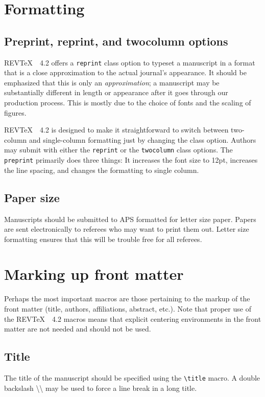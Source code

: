\documentclass[twocolumn,secnumarabic,amssymb, nobibnotes, aps, prd]{revtex4-2}
\newcommand{\revtex}{REV\TeX\ }
\newcommand{\classoption}[1]{\texttt{#1}}
\newcommand{\macro}[1]{\texttt{\textbackslash#1}}
\newcommand{\m}[1]{\macro{#1}}
\begin{document}
\section{Formatting}
\subsection{Preprint, reprint, and twocolumn options}
\revtex~4.2 offers a \classoption{reprint} class option to typeset a manuscript
in a format that is a close approximation to the actual journal's appearance. It should
be emphasized that this is only an \textit{approximation}; a manuscript may be substantially different
in length or appearance after it goes through our production process. This is mostly due to the choice
of fonts and the scaling of figures.

\revtex\ 4.2 is designed to
make it straightforward to switch between two-column and single-column
formatting just by changing the class option. Authors may submit with
either the \classoption{reprint} or the \classoption{twocolumn} class options.
The \classoption{preprint} primarily does three things: It increases
the font size to 12pt, increases the line spacing, and changes the
formatting to single column.

\subsection{Paper size}
Manuscripts should be submitted to APS formatted for letter size
paper. Papers are sent electronically to referees who may
want to print them out. Letter size formatting ensures that this will
be trouble free for all referees.

\section{Marking up front matter}
Perhaps the most important macros are those 
pertaining to the markup of the front matter (title, authors,
affiliations, abstract, etc.). Note that proper
use of the \revtex\ 4.2 macros means that explicit centering environments
in the front matter are not needed and should not be used.

\subsection{Title}
The title of the manuscript should be specified using the \m{title} macro. A
double backslash {\textbackslash\textbackslash} may be used to force a line break in a long
title.
\end{document}
